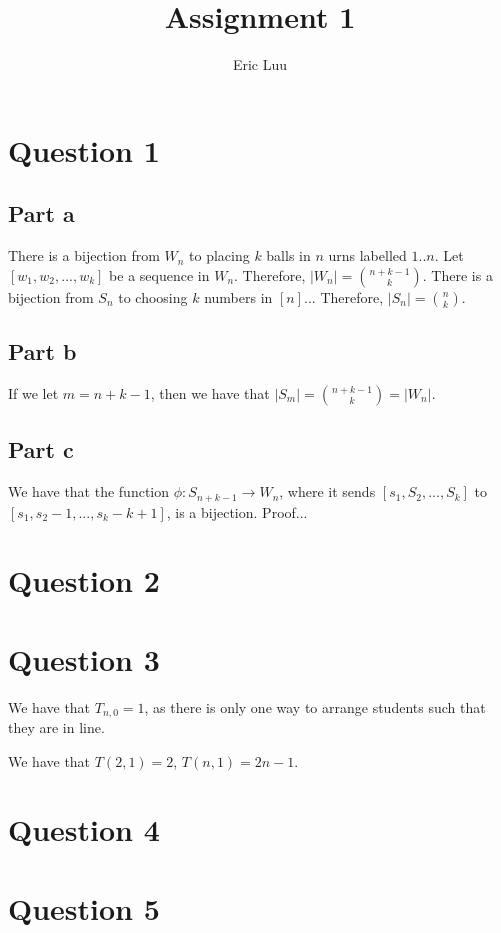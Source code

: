 \documentclass[]{article}
\title{Assignment 1}
\author{Eric Luu}
\begin{document}
\maketitle
\section{Question 1}
\subsection{Part a}
There is a bijection from $W_n$ to placing $k$ balls in $n$ urns labelled $1 .. n$. Let $[w_1, w_2, ..., w_{k}]$ be a sequence in $W_n$.
Therefore, $|W_n| = \binom{n + k - 1}{k}$. 
There is a bijection from $S_n$ to choosing $k$ numbers in $[n]$...
Therefore, $|S_n| = \binom{n}{k}$. 
\subsection{Part b}
If we let $m = n + k - 1$, then we have that $|S_m| = \binom{n + k - 1}{k} = |W_n|$. 
\subsection{Part c}
We have that the function $\phi: S_{n + k - 1} \rightarrow W_n$, where it sends $[s_1, S_2, ..., S_{k}]$ to $[s_1, s_2 - 1, ..., s_{k} - k + 1]$, is a bijection. Proof...
\section{Question 2}
\section{Question 3}
We have that $T_{n, 0} = 1$, as there is only one way to arrange students such that they are in line.

We have that $T(2, 1) = 2$, $T(n, 1) = 2n - 1$. 
\section{Question 4}
\section{Question 5}
\end{document}
